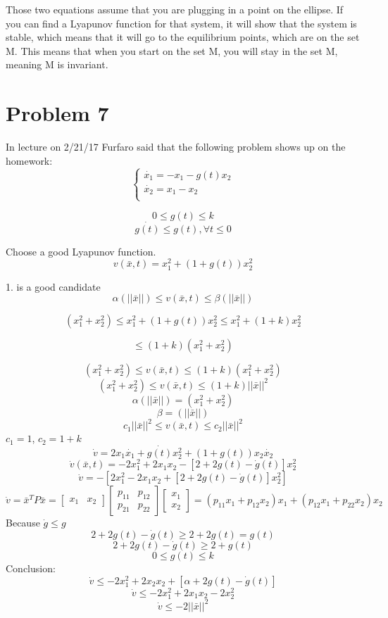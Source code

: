 \documentclass[12pt]{article}
\begin{document}
Those two equations assume that you are plugging in a point on the ellipse. If you can find a Lyapunov function for that system, it will show that the system is stable, which means that it will go to the equilibrium points, which are on the set M. This means that when you start on the set M, you will stay in the set M, meaning M is invariant.  

\section*{Problem 7}
In lecture on 2/21/17 Furfaro said that the following problem shows up on the homework:
$$\begin{cases}\dot{x_1}=-x_1-g(t)x_2\\ 
\dot{x_2}=x_1-x_2\\
\end{cases}$$ 

$$0\leq g(t)\leq k$$
$$\dot{g(t)} \leq g(t), \forall t \leq 0$$

Choose a good Lyapunov function. 
$$v(\bar{x},t)=x_1^2+(1+g(t))x_2^2$$

1. is a good candidate\\
$$\alpha(||\bar{x}||)\leq v(\bar{x},t)\leq \beta(||\bar{x}||)$$

$$(x_1^2+x_2^2)\leq x_1^2+(1+g(t))x_2^2\leq x_1^2+(1+k)x_2^2$$

$$\leq(1+k)(x_1^2+x_2^2)$$

$$(x_1^2+x_2^2)\leq v(\bar{x},t)\leq (1+k)(x_1^2+x_2^2)$$
$$(x_1^2+x_2^2)\leq v(\bar{x},t)\leq (1+k)||\bar{x}||^2$$
$$\alpha(||\bar{x}||)=(x_1^2+x_2^2)$$
$$\beta=(||\bar{x}||)$$
$$c_1||\bar{x}||^2\leq v(\bar{x},t)\leq c_2||\bar{x}||^2$$
$c_1=1$, $c_2=1+k$
$$\dot{v}=2x_1\dot{x_1}+\dot{g(t)}x_2^2+(1+g(t))x_2\dot{x_2}$$
$$\dot{v}(\bar{x},t)=-2x_1^2+2x_1x_2-[2+2g(t)-\dot{g}(t)]x_2^2$$
$$\dot{v}=-[2x_1^2-2x_1x_2+[2+2g(t)-\dot{g}(t)]x_2^2]$$
$$\dot{v}=\bar{x}^TP\bar{x}=\begin{bmatrix} x_1 & x_2 \end{bmatrix}
\begin{bmatrix} p_{11} & p_{12} \\
p_{21} & p_{22} \end{bmatrix}\begin{bmatrix} x_1 \\ x_2 \end{bmatrix} = (p_{11}x_1+p_{12}x_2)x_1+(p_{12}x_1+p_{22}x_2)x_2$$
Because $\dot{g}\leq g$
$$2+2g(t)-\dot{g}(t)\geq 2+2g(t)=g(t)$$
$$2+2g(t)-\dot{g}(t)\geq 2+g(t)$$
$$0\leq g(t) \leq k$$
Conclusion:
$$\dot{v}\leq -2x_1^2+2x_2x_2+[\alpha+2g(t)-\dot{g}(t)]$$
$$\dot{v}\leq -2x_1^2+2x_1x_2-2x_2^2$$
$$\dot{v}\leq -2||\bar{x}||^2$$
\end{document}
